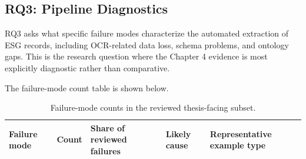 \subsection{RQ3: Pipeline Diagnostics}

RQ3 asks what specific failure modes characterize the automated extraction of ESG records, including OCR-related data loss, schema problems, and ontology gaps. This is the research question where the Chapter 4 evidence is most explicitly diagnostic rather than comparative.

The failure-mode count table is shown below.

\begin{landscape}
\begin{table}[p]
\centering
\caption{Failure-mode counts in the reviewed thesis-facing subset.}
\label{tab:failure-mode-counts}
\small
\renewcommand{\arraystretch}{1.2}
\begin{tabularx}{\linewidth}{|X|p{1.8cm}|p{1.8cm}|X|X|}
\hline
\textbf{Failure mode} & \textbf{Count} & \textbf{Share of reviewed failures} & \textbf{Likely cause} & \textbf{Representative example type} \\ \hline


\end{tabularx}
\end{table}
\end{landscape}
